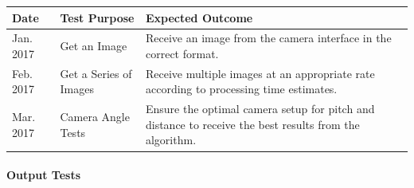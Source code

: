 \documentclass[12pt]{article}
\begin{document}
\begin{longtable}[]{@{}lll@{}}
\toprule
\begin{minipage}[b]{0.06\columnwidth}\raggedright\strut
Date\strut
\end{minipage} & \begin{minipage}[b]{0.16\columnwidth}\raggedright\strut
Test Purpose\strut
\end{minipage} & \begin{minipage}[b]{0.22\columnwidth}\raggedright\strut
Expected Outcome\strut
\end{minipage}\tabularnewline
\midrule
\endhead
\begin{minipage}[t]{0.06\columnwidth}\raggedright\strut
Jan. 2017\strut
\end{minipage} & \begin{minipage}[t]{0.16\columnwidth}\raggedright\strut
Get an Image\strut
\end{minipage} & \begin{minipage}[t]{0.22\columnwidth}\raggedright\strut
Receive an image from the camera interface in the correct format.\strut
\end{minipage}\tabularnewline
\begin{minipage}[t]{0.06\columnwidth}\raggedright\strut
Feb. 2017\strut
\end{minipage} & \begin{minipage}[t]{0.16\columnwidth}\raggedright\strut
Get a Series of Images\strut
\end{minipage} & \begin{minipage}[t]{0.22\columnwidth}\raggedright\strut
Receive multiple images at an appropriate rate according to processing
time estimates.\strut
\end{minipage}\tabularnewline
\begin{minipage}[t]{0.06\columnwidth}\raggedright\strut
Mar. 2017\strut
\end{minipage} & \begin{minipage}[t]{0.16\columnwidth}\raggedright\strut
Camera Angle Tests\strut
\end{minipage} & \begin{minipage}[t]{0.22\columnwidth}\raggedright\strut
Ensure the optimal camera setup for pitch and distance to receive the
best results from the algorithm.\strut
\end{minipage}\tabularnewline
\bottomrule
\end{longtable}

\paragraph{Output Tests}\label{output-tests}
\end{document}
